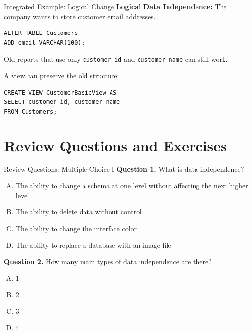 \documentclass[aspectratio=169,11pt]{beamer}
\begin{document}
\begin{frame}[fragile]{Integrated Example: Logical Change}
\textbf{Logical Data Independence:} The company wants to store customer email addresses.

\begin{lstlisting}[style=sqlstyle]
ALTER TABLE Customers
ADD email VARCHAR(100);
\end{lstlisting}

Old reports that use only \texttt{customer\_id} and \texttt{customer\_name} can still work.

\vspace{0.2cm}
A view can preserve the old structure:
\begin{lstlisting}[style=sqlstyle]
CREATE VIEW CustomerBasicView AS
SELECT customer_id, customer_name
FROM Customers;
\end{lstlisting}
\end{frame}

\section{Review Questions and Exercises}

\begin{frame}{Review Questions: Multiple Choice I}
\textbf{Question 1.} What is data independence?
\begin{enumerate}[A.]
  \item The ability to change a schema at one level without affecting the next higher level
  \item The ability to delete data without control
  \item The ability to change the interface color
  \item The ability to replace a database with an image file
\end{enumerate}

\vspace{0.2cm}
\textbf{Question 2.} How many main types of data independence are there?
\begin{enumerate}[A.]
  \item 1
  \item 2
  \item 3
  \item 4
\end{enumerate}
\end{frame}
\end{document}
